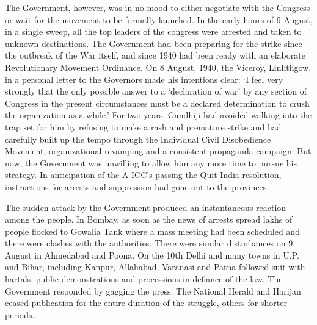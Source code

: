The Government, however, was in no mood to either negotiate with the Congress or wait for the movement to be formally launched. In the early hours of 9 August, in a single sweep, all the top leaders of the congress were arrested and taken to unknown destinations. The Government had been preparing for the strike since the outbreak of the War itself, and since 1940 had been ready with an elaborate Revolutionary Movement Ordinance. On 8 August, 1940, the Viceroy, Linlithgow, in a personal letter to the Governors made his intentions clear: ‘I feel very strongly that the only possible answer to a ‘declaration of war’ by any section of Congress in the present circumstances must be a declared determination to crush the organization as a while.’ For two years, Gandhiji had avoided walking into the trap set for him by refusing to make a rash and premature strike and had carefully built up the tempo through the Individual Civil Disobedience Movement, organizational revamping and a consistent propaganda campaign. But now, the Government was unwilling to allow him any more time to pursue his strategy. In anticipation of the A ICC’s passing the Quit India resolution, instructions for arrests and suppression had gone out to the provinces.

The sudden attack by the Government produced an instantaneous reaction among the people. In Bombay, as soon as the news of arrests spread lakhs of people flocked to Gowalia Tank where a mass meeting had been scheduled and there were clashes with the authorities. There were similar disturbances on 9 August in Ahmedabad and Poona. On the 10th Delhi and many towns in U.P. and Bihar, including Kanpur, Allahabad, Varanasi and Patna followed suit with hartals, public demonstrations and processions in defiance of the law. The Government responded by gagging the press. The National Herald and Harijan ceased publication for the entire duration of the struggle, others for shorter periods.

